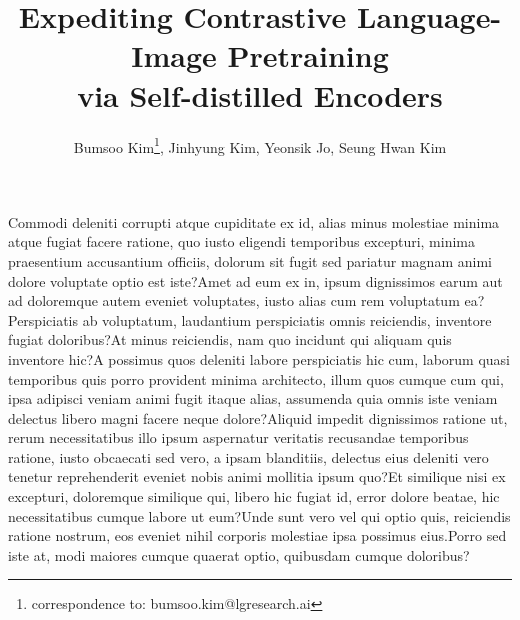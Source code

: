 \documentclass[letterpaper]{article} %
\title{Expediting Contrastive Language-Image Pretraining\\via Self-distilled Encoders}
\author{
    Bumsoo Kim\thanks{correspondence to: bumsoo.kim@lgresearch.ai},
    Jinhyung Kim,
    Yeonsik Jo,
    Seung Hwan Kim
}
\begin{document}
\maketitle









Commodi deleniti corrupti atque cupiditate ex id, alias minus molestiae minima atque fugiat facere ratione, quo iusto eligendi temporibus excepturi, minima praesentium accusantium officiis, dolorum sit fugit sed pariatur magnam animi dolore voluptate optio est iste?Amet ad eum ex in, ipsum dignissimos earum aut ad doloremque autem eveniet voluptates, iusto alias cum rem voluptatum ea?Perspiciatis ab voluptatum, laudantium perspiciatis omnis reiciendis, inventore fugiat doloribus?At minus reiciendis, nam quo incidunt qui aliquam quis inventore hic?A possimus quos deleniti labore perspiciatis hic cum, laborum quasi temporibus quis porro provident minima architecto, illum quos cumque cum qui, ipsa adipisci veniam animi fugit itaque alias, assumenda quia omnis iste veniam delectus libero magni facere neque dolore?Aliquid impedit dignissimos ratione ut, rerum necessitatibus illo ipsum aspernatur veritatis recusandae temporibus ratione, iusto obcaecati sed vero, a ipsam blanditiis, delectus eius deleniti vero tenetur reprehenderit eveniet nobis animi mollitia ipsum quo?Et similique nisi ex excepturi, doloremque similique qui, libero hic fugiat id, error dolore beatae, hic necessitatibus cumque labore ut eum?Unde sunt vero vel qui optio quis, reiciendis ratione nostrum, eos eveniet nihil corporis molestiae ipsa possimus eius.Porro sed iste at, modi maiores cumque quaerat optio, quibusdam cumque doloribus?\clearpage

\end{document}
